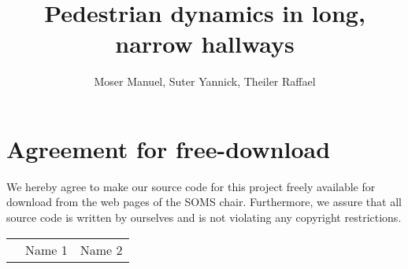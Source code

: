 \documentclass[11pt]{article}
\title{Pedestrian dynamics in long, narrow hallways}
\author{Moser Manuel, Suter Yannick, Theiler Raffael}
\begin{document}

\newpage


\newpage
\section*{Agreement for free-download}
\bigskip


\bigskip


\large We hereby agree to make our source code for this project freely available for download from the web pages of the SOMS chair. Furthermore, we assure that all source code is written by ourselves and is not violating any copyright restrictions.

\begin{center}

\bigskip


\bigskip


\begin{tabular}{@{}p{3.3cm}@{}p{6cm}@{}@{}p{6cm}@{}}
\begin{minipage}{3cm}

\end{minipage}
&
\begin{minipage}{6cm}
\vspace{2mm} \large Name 1

 \vspace{\baselineskip}

\end{minipage}
&
\begin{minipage}{6cm}

\large Name 2

\end{minipage}
\end{tabular}


\end{center}
\newpage







\tableofcontents

\newpage

\end{document}
